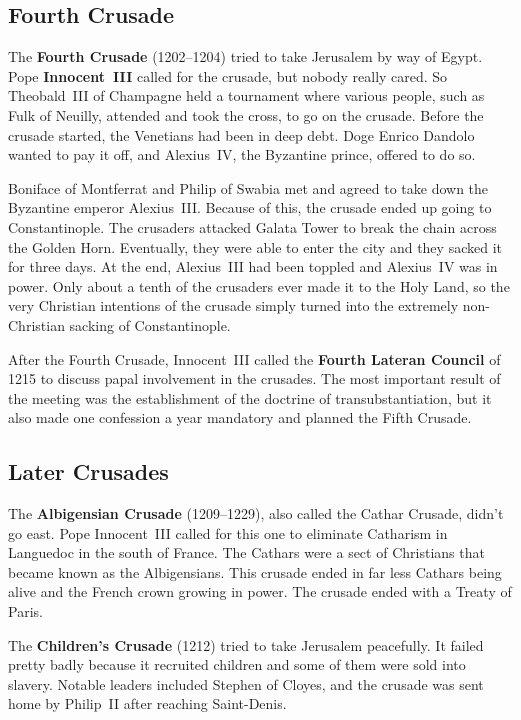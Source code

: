 \subsection*{Fourth Crusade}

The \textbf{Fourth Crusade} (1202--1204) tried to take Jerusalem by way of Egypt.
Pope \textbf{Innocent~III} called for the crusade, but nobody really cared.
So Theobald~III of Champagne held a tournament where various people, such as Fulk of Neuilly,
attended and took the cross, to go on the crusade.
Before the crusade started, the Venetians had been in deep debt.
Doge Enrico Dandolo wanted to pay it off, and Alexius~IV, the Byzantine prince, offered to do so.

Boniface of Montferrat and Philip of Swabia met
and agreed to take down the Byzantine emperor Alexius~III\@.
Because of this, the crusade ended up going to Constantinople.
The crusaders attacked Galata Tower to break the chain across the Golden Horn.
Eventually, they were able to enter the city and they sacked it for three days.
At the end, Alexius~III had been toppled and Alexius~IV was in power.
Only about a tenth of the crusaders ever made it to the Holy Land,
so the very Christian intentions of the crusade simply turned into
the extremely non-Christian sacking of Constantinople.

After the Fourth Crusade,
Innocent~III called the \textbf{Fourth Lateran Council} of 1215
to discuss papal involvement in the crusades.
The most important result of the meeting
was the establishment of the doctrine of transubstantiation,
but it also made one confession a year mandatory and planned the Fifth Crusade.

\subsection*{Later Crusades}

The \textbf{Albigensian Crusade} (1209--1229), also called the Cathar Crusade, didn't go east.
Pope Innocent~III called for this one to eliminate Catharism in Languedoc in the south of France.
The Cathars were a sect of Christians that became known as the Albigensians.
This crusade ended in far less Cathars being alive and the French crown growing in power.
The crusade ended with a Treaty of Paris.

The \textbf{Children's Crusade} (1212) tried to take Jerusalem peacefully.
It failed pretty badly because it recruited children and some of them were sold into slavery.
Notable leaders included Stephen of Cloyes,
and the crusade was sent home by Philip~II after reaching Saint-Denis.

